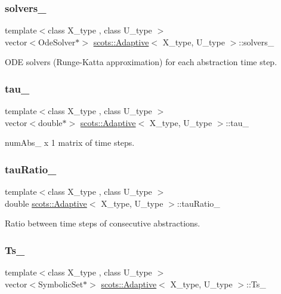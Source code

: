 \subsubsection{\texorpdfstring{solvers\+\_\+}{solvers\_}}
{\footnotesize\ttfamily template$<$class X\+\_\+type , class U\+\_\+type $>$ \\
vector$<$Ode\+Solver$\ast$$>$ \hyperlink{classscots_1_1Adaptive}{scots\+::\+Adaptive}$<$ X\+\_\+type, U\+\_\+type $>$\+::solvers\+\_\+}

O\+DE solvers (Runge-\/\+Katta approximation) for each abstraction time step. \mbox{\label{classscots_1_1Adaptive_a2276dbf06b4db12739aed70443c1a32d}} 
\subsubsection{\texorpdfstring{tau\+\_\+}{tau\_}}
{\footnotesize\ttfamily template$<$class X\+\_\+type , class U\+\_\+type $>$ \\
vector$<$double$\ast$$>$ \hyperlink{classscots_1_1Adaptive}{scots\+::\+Adaptive}$<$ X\+\_\+type, U\+\_\+type $>$\+::tau\+\_\+}

num\+Abs\+\_\+ x 1 matrix of time steps. \mbox{\label{classscots_1_1Adaptive_a33592a853774854552908de4762f8f8c}} 
\subsubsection{\texorpdfstring{tau\+Ratio\+\_\+}{tauRatio\_}}
{\footnotesize\ttfamily template$<$class X\+\_\+type , class U\+\_\+type $>$ \\
double \hyperlink{classscots_1_1Adaptive}{scots\+::\+Adaptive}$<$ X\+\_\+type, U\+\_\+type $>$\+::tau\+Ratio\+\_\+}

Ratio between time steps of consecutive abstractions. \mbox{\label{classscots_1_1Adaptive_ab9f37fda9e698b797079d28b243f3a5b}} 
\subsubsection{\texorpdfstring{Ts\+\_\+}{Ts\_}}
{\footnotesize\ttfamily template$<$class X\+\_\+type , class U\+\_\+type $>$ \\
vector$<$Symbolic\+Set$\ast$$>$ \hyperlink{classscots_1_1Adaptive}{scots\+::\+Adaptive}$<$ X\+\_\+type, U\+\_\+type $>$\+::Ts\+\_\+}

